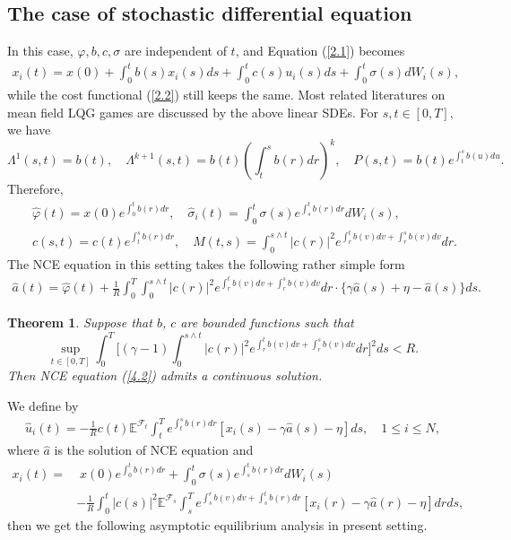 \documentclass[11pt]{article}
\newtheorem{theorem}{Theorem}[section]
\def\dbE{\mathbb{E}}
\begin{document}
\subsection{The case of stochastic differential equation}
In this case, $\varphi ,b,c,\sigma $ are independent of $t$, and
Equation (\ref{2.1}) becomes
\begin{eqnarray}\label{4.1}
x_{i}(t)=x(0)+\int_{0}^{t}b(s)x_{i}(s)ds+%
\int_{0}^{t}c(s)u_{i}(s)ds+\int_{0}^{t}\sigma(s)dW_i(s),
\end{eqnarray}
while the cost functional (\ref{2.2}) still keeps the same. Most related literatures on mean field LQG games are discussed
by the above linear SDEs. For $s,t\in[0,T],$ we have
%
\[
\Lambda^{1}(s,t)=b(t), \quad
\Lambda^{k+1}(s,t)=b(t)\left(\int_{t}^{s}b(r)dr\right)^{k}, \quad
P(s,t)=b(t)e^{\int_{t}^{s}b(u)du}.
\]
%
Therefore,
%
\begin{eqnarray*}
& & \widehat{\varphi }(t) = x(0)e^{\int_{0}^{t}b(r)dr}, \quad \widehat{\sigma}_i(t) =\int_{0}^{t}\sigma (s)e^{\int_{s}^{t}b(r)dr}dW_{i}(s), \\
& & \widehat{c}(s,t)=c(t)e^{\int_{t}^{s}b(r)dr}, \quad M(t,s)=\int_{0}^{s\wedge t}|c(r)|^{2}e^{\int_{r}^{t}b(v)dv+\int_{r}^{s}b(v)dv}dr.
\end{eqnarray*}%
%
The NCE equation in this setting takes the following rather simple form
%
\begin{eqnarray}\label{4.2}
\widehat{a}(t)=\widehat{\varphi
}(t)+\frac{1}{R}\int_{0}^{T}\int_{0}^{s\wedge
t}|c(r)|^{2}e^{\int_{r}^{t}b(v)dv+\int_{r}^{s}b(v)dv}dr\cdot\big\{\gamma
\widehat{a}(s)+\eta-\widehat{a}(s)\big\}ds.
\end{eqnarray}
%

\begin{theorem}\label{theorem4-1}
Suppose that $b$, $c$ are bounded functions such that
%
\[
\sup_{t\in [0,T]}\int_{0}^{T}\Big[(\gamma -1)\int_{0}^{s\wedge t}|c(r)|^{2}e^{\int_{r}^{t}b(v)dv+\int_{r}^{s}b(v)dv}dr\Big]^{2}ds<R.
\]
%
Then NCE equation (\ref{4.2}) admits a continuous solution.
\end{theorem}
We define by
%
\begin{eqnarray}\label{4.3}
\widehat{u}_i(t)=-\frac{1}{R}c(t)\dbE^{\mathcal{F}_t}\!\!\int_t^Te^{\int_t^sb(r)dr}[x_i(s) -\gamma\widehat{a}(s)-\eta]ds,\quad 1\leq i\leq N,
\end{eqnarray}
%
where $\widehat{a}$ is the solution of NCE equation and
%
\begin{align}
x_{i}(t) = & \; x(0)e^{\int_{0}^{t}b(r)dr}+\int_{0}^{t}\sigma (s)e^{\int_{s}^{t}b(r)dr}dW_{i}(s) \nonumber \\
& -\frac{1}{R}\int_{0}^{t}|c(s)|^2\dbE^{\mathcal{F}_{s}}\int_{s}^{T}e^{\int_{s}^{r}b(v)dv+\int_s^tb(r)dr} [x_{i}(r)-\gamma\widehat{a}(r)-\eta]drds, \label{4.4}
\end{align}
%
then we get the following asymptotic equilibrium analysis in present setting.
\end{document}
